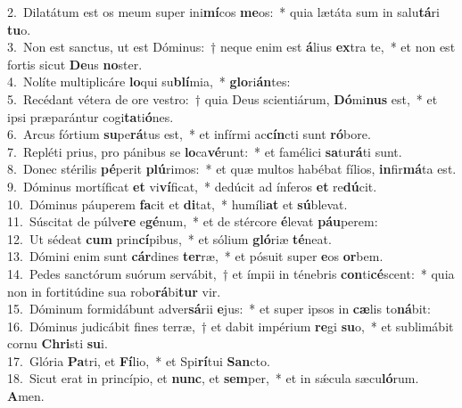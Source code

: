 {2.~}Dilatátum est os meum super ini\textbf{mí}cos \textbf{me}os:~* quia lætáta sum in salu\textbf{tá}ri \textbf{tu}o.\\
{3.~}Non est sanctus, ut est Dóminus:~† neque enim est \textbf{á}lius \textbf{ex}tra te,~* et non est fortis sicut \textbf{De}us \textbf{no}ster.\\
{4.~}Nolíte multiplicáre \textbf{lo}qui su\textbf{blí}mia,~* \textbf{glo}ri\textbf{án}tes:\\
{5.~}Recédant vétera de ore vestro:~† quia Deus scientiárum, \textbf{Dó}mi\textbf{nus} est,~* et ipsi præparántur cogi\textbf{ta}ti\textbf{ó}nes.\\
{6.~}Arcus fórtium \textbf{su}pe\textbf{rá}tus est,~* et infírmi ac\textbf{cín}cti sunt \textbf{ró}bore.\\
{7.~}Repléti prius, pro pánibus se \textbf{lo}ca\textbf{vé}runt:~* et famélici \textbf{sa}tu\textbf{rá}ti sunt.\\
{8.~}Donec stérilis \textbf{pé}perit \textbf{plú}rimos:~* et quæ multos habébat fílios, \textbf{in}fir\textbf{má}ta est.\\
{9.~}Dóminus mortíficat \textbf{et} vi\textbf{ví}ficat,~* dedúcit ad ínferos \textbf{et} re\textbf{dú}cit.\\
{10.~}Dóminus páuperem \textbf{fa}cit et \textbf{di}tat,~* humíli\textbf{at} et \textbf{sú}blevat.\\
{11.~}Súscitat de púlve\textbf{re} e\textbf{gé}num,~* et de stércore \textbf{é}levat \textbf{páu}perem:\\
{12.~}Ut sédeat \textbf{cum} prin\textbf{cí}pibus,~* et sólium \textbf{gló}riæ \textbf{té}neat.\\
{13.~}Dómini enim sunt \textbf{cár}dines \textbf{ter}ræ,~* et pósuit super \textbf{e}os \textbf{or}bem.\\
{14.~}Pedes sanctórum suórum servábit,~† et ímpii in ténebris \textbf{con}ti\textbf{cé}scent:~* quia non in fortitúdine sua robo\textbf{rá}bi\textbf{tur} vir.\\
{15.~}Dóminum formidábunt adver\textbf{sá}rii \textbf{e}jus:~* et super ipsos in \textbf{cæ}lis to\textbf{ná}bit:\\
{16.~}Dóminus judicábit fines terræ,~† et dabit impérium \textbf{re}gi \textbf{su}o,~* et sublimábit cornu \textbf{Chri}sti \textbf{su}i.\\
{17.~}Glória \textbf{Pa}tri, et \textbf{Fí}lio,~* et Spi\textbf{rí}tui \textbf{San}cto.\\
{18.~}Sicut erat in princípio, et \textbf{nunc}, et \textbf{sem}per,~* et in sǽcula sæcu\textbf{ló}rum. \textbf{A}men.\\
